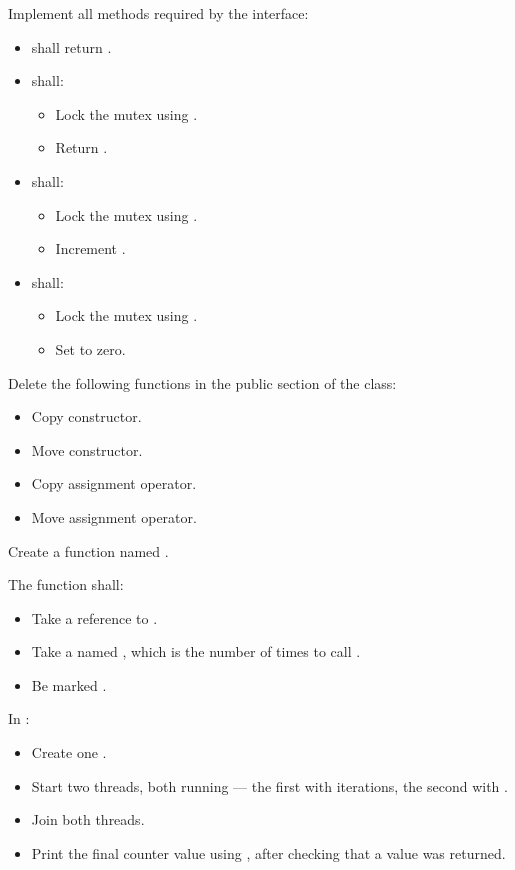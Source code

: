 Implement all methods required by the interface:
\begin{itemize}
  \item {} shall return .
  \item {} shall:
  \begin{itemize}
    \item Lock the mutex using .
    \item Return .
  \end{itemize}
  \item {} shall:
  \begin{itemize}
    \item Lock the mutex using .
    \item Increment .
  \end{itemize}
  \item {} shall:
  \begin{itemize}
    \item Lock the mutex using .
    \item Set  to zero.
  \end{itemize}
\end{itemize}

Delete the following functions in the public section of the class:
\begin{itemize}
  \item Copy constructor.
  \item Move constructor.
  \item Copy assignment operator.
  \item Move assignment operator.
\end{itemize}

\label{c6:ex:4.3}
Create a function named .

The function shall:
\begin{itemize}
  \item Take a reference to .
  \item Take a  named , which is the number of times to call
    .
  \item Be marked .
\end{itemize}
In :
\begin{itemize}
  \item Create one .
  \item Start two threads, both running  --- the first with 
    iterations, the second with .
  \item Join both threads.
  \item Print the final counter value using , after checking that a value was
    returned.
\end{itemize}

